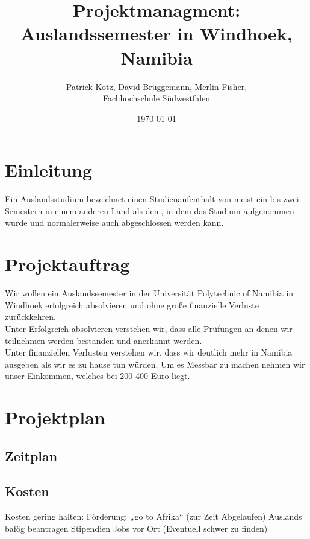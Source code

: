 \documentclass[11pt]{article}
\begin{document}
\begin{titlepage}
  \title{Projektmanagment: \\Auslandssemester in Windhoek, Namibia}
  \author{Patrick Kotz, David Brüggemann, Merlin Fisher,\\ Fachhochschule Südwestfalen}
  \date{\today}
\end{titlepage}


\maketitle

\newpage
\tableofcontents
\newpage

\section{Einleitung}
Ein Auslandsstudium bezeichnet einen Studienaufenthalt von meist ein bis zwei Semestern in einem anderen Land als dem, in dem das Studium aufgenommen wurde und normalerweise auch abgeschlossen werden kann.

\section{Projektauftrag}
Wir wollen ein Auslandssemester in der Universität Polytechnic of Namibia in Windhoek erfolgreich absolvieren und ohne große finanzielle Verluste zurückkehren.\\

Unter Erfolgreich absolvieren verstehen wir, dass alle Prüfungen an denen wir teilnehmen werden bestanden und anerkannt werden.\\

Unter finanziellen Verlusten verstehen wir, dass wir deutlich mehr in Namibia ausgeben als wir es zu hause tun würden. Um es Messbar zu machen nehmen wir unser Einkommen, welches bei 200-400 Euro liegt.


\section{Projektplan}



\subsection{Zeitplan}

\subsection{Kosten}
Kosten gering halten:
Förderung: „go to Afrika“ (zur Zeit Abgelaufen)
Auslands bafög beantragen
Stipendien
Jobs vor Ort (Eventuell schwer zu finden)\\
\end{document}
